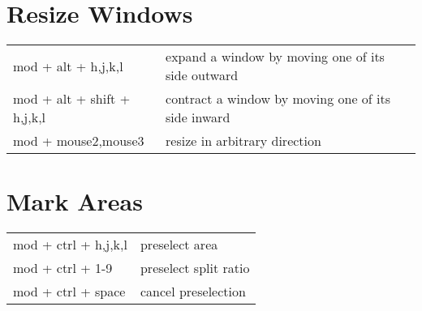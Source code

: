 \documentclass[
    a4paper,
    10pt,
    notitlepage,
    egregdoesnotlikesansseriftitles
]{scrartcl}
\begin{document}
\section{Resize Windows}
\begin{tabular}{p{4cm}l}
    mod + alt + h,j,k,l   & expand a window by moving one of its side outward \\
    mod + alt + shift + h,j,k,l & contract a window by moving one of its side inward \\
    mod + mouse2,mouse3   & resize in arbitrary direction
\end{tabular}

\section{Mark Areas}
\begin{tabular}{p{4cm}l}
    mod + ctrl + h,j,k,l  & preselect area                    \\
    mod + ctrl + 1-9      & preselect split ratio             \\
    mod + ctrl + space    & cancel preselection
\end{tabular}

\end{document}
